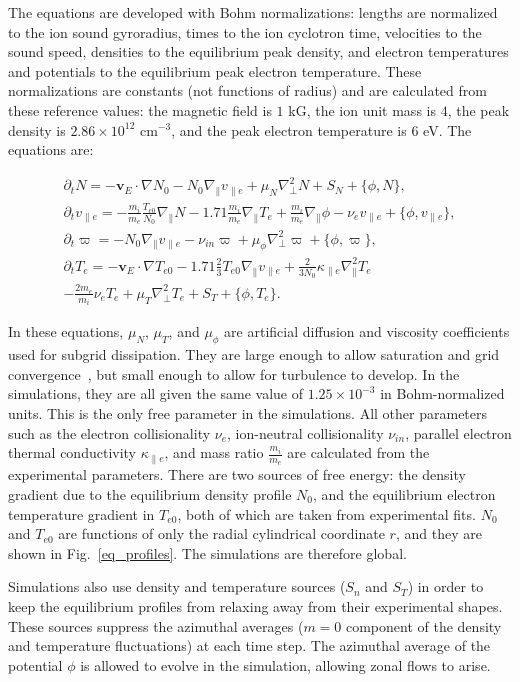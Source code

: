 \documentclass[showpacs,preprintnumbers,amsmath,amssymb,superscriptaddress,aip]{revtex4-1}
\def\beqar{\begin{eqnarray}}
\def\eeqar{\end{eqnarray}}
\newcommand{\pdt}{\partial_t}
\def\grad{\nabla}
\newcommand{\gradpar}{\grad_\parallel}
\newcommand{\gradperp}{\grad_\perp}
\newcommand{\vpe}{v_{\parallel e}}
\newcommand{\nue}{\nu_{e}}
\newcommand{\nuin}{\nu_{in}}
\newcommand{\kpe}{\kappa_{\parallel e}}
\newcommand{\fmie}{\frac{m_i}{m_e}}
\begin{document}
The equations are developed with Bohm normalizations: lengths are
normalized to the ion sound gyroradius, times to the ion
cyclotron time, velocities to the sound speed, densities to the equilibrium peak density, and electron
temperatures and potentials to the equilibrium peak electron temperature. These normalizations are constants (not functions of radius) and are calculated from these reference values:
the magnetic field is $1$ kG, the ion unit mass is $4$, the peak density is $2.86 \times 10^{12}$ cm$^{-3}$, and the peak electron temperature
is $6$ eV. The equations are:

\beqar
\label{ni_eq}
\pdt N = - {\mathbf v_E} \cdot \grad N_0 - N_0 \gradpar \vpe + \mu_N \gradperp^2 N + S_N + \{\phi,N\}, \\
\label{ve_eq}
\pdt \vpe = - \fmie \frac{T_{e0}}{N_0} \gradpar N - 1.71 \fmie \gradpar T_e  + \fmie \gradpar \phi - \nue \vpe + \{\phi,\vpe \}, \\
\label{rho_eq}
\pdt \varpi = - N_0 \gradpar \vpe  - \nuin \varpi + \mu_\phi \gradperp^2 \varpi + \{\phi,\varpi \}, \\
\label{te_eq}
\pdt T_e = - {\mathbf v_E} \cdot \grad T_{e0} - 1.71 \frac{2}{3} T_{e0} \gradpar \vpe + \frac{2}{3 N_0} \kpe \gradpar^2 T_e  \nonumber \\
- \frac{2 m_e}{m_i} \nue T_e  + \mu_T \gradperp^2 T_e +  S_T + \{\phi,T_e\}.
\eeqar

In these equations, $\mu_N$, $\mu_T$, and $\mu_\phi$ are artificial diffusion and viscosity coefficients used for subgrid dissipation. They are large enough to allow saturation
and grid convergence~\cite{friedman2012}, but small enough to allow for turbulence to develop. In the simulations, they are all given the same value of $1.25 \times 10^{-3}$ in Bohm-normalized units. 
This is the only free parameter in the simulations. All other parameters such as the electron collisionality $\nue$, ion-neutral
collisionality $\nuin$, parallel electron thermal conductivity $\kpe$, and mass ratio $\fmie$ are calculated from the experimental parameters.
There are two sources of free energy: the density gradient due to the equilibrium density profile $N_0$, and the equilibrium electron temperature gradient in $T_{e0}$, both of which are
taken from experimental fits. $N_0$ and $T_{e0}$ are functions of only the radial cylindrical coordinate $r$, and they are shown in Fig.~\ref{eq_profiles}. The simulations are therefore global.

Simulations also use density and temperature sources ($S_n$ and $S_T$) in order to keep the equilibrium profiles from relaxing away from their experimental shapes. 
These sources suppress the azimuthal averages ($m=0$ component of the density and temperature fluctuations) at each time step. 
The azimuthal average of the potential $\phi$ is allowed to evolve in
the simulation, allowing zonal flows to arise.
\end{document}
